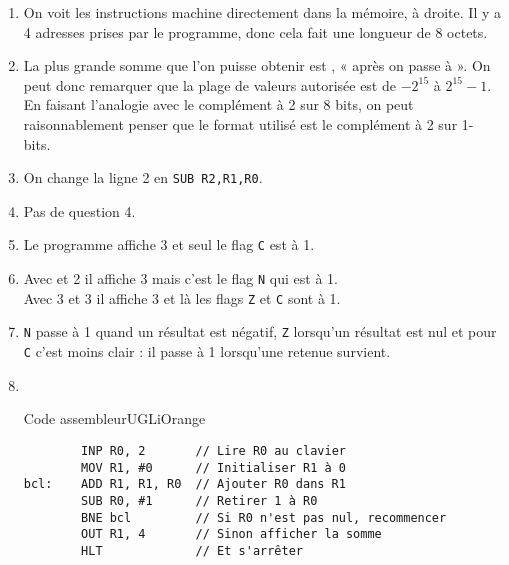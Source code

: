\documentclass[12pt,a4paper,article,firamath]{nsi}
\begin{document}
\maketitle
\begin{enumerate}



\item	On voit les instructions machine directement dans la mémoire, à droite. Il y a 4 adresses prises par le programme, donc cela fait une longueur de 8 octets.\\

\item La plus grande somme que l'on puisse obtenir est , « après on passe à  ». On peut donc remarquer que la plage de valeurs autorisée est de $-2^{15}$ à $2^{15}-1$. En faisant l'analogie avec le complément à 2 sur 8 bits, on peut raisonnablement penser que le format utilisé est le complément à 2 sur 1- bits.\\

\item On change la ligne 2 en \texttt{SUB R2,R1,R0}.\\

\item Pas de question 4.\\

\item Le programme affiche 3 et seul le flag \texttt{C} est à 1.\\

\item Avec et 2 il affiche 3 mais c'est le flag \texttt{N} qui est à 1.\\
Avec 3 et 3 il affiche 3 et là les flags \texttt{Z} et \texttt{C} sont à 1.\\

\item \texttt{N} passe à 1 quand un résultat est négatif, \texttt{Z} lorsqu'un résultat est nul et pour \texttt{C} c'est moins clair : il passe à 1 lorsqu'une retenue survient.\\

\item \ \\
\begin{encadrecolore}{Code assembleur}{UGLiOrange}
\begin{verbatim}
        INP R0, 2       // Lire R0 au clavier
        MOV R1, #0      // Initialiser R1 à 0
bcl:    ADD R1, R1, R0  // Ajouter R0 dans R1
        SUB R0, #1      // Retirer 1 à R0
        BNE bcl         // Si R0 n'est pas nul, recommencer
        OUT R1, 4       // Sinon afficher la somme
        HLT             // Et s'arrêter
\end{verbatim}
\end{encadrecolore}

\end{enumerate}
\end{document}

